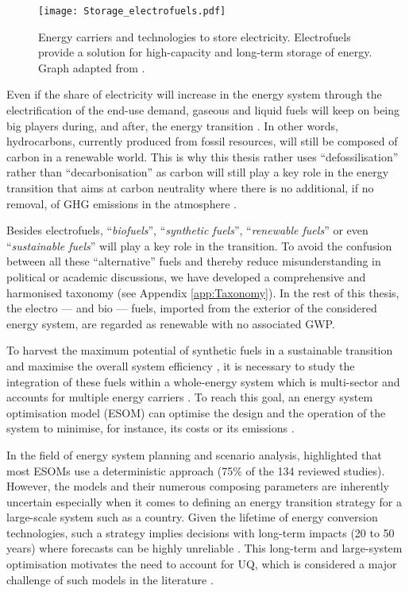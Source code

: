 \begin{figure}[htbp!]
\centering
\texttt{[image: Storage\_electrofuels.pdf]}
\caption{Energy carriers and technologies to store electricity. Electrofuels provide a solution for high-capacity and long-term storage of energy. Graph adapted from \cite{ISPT2017}.}
\label{fig:intro:Storage_electrofuels}
\end{figure}

\newpage
Even if the share of electricity will increase in the energy system through the electrification of the end-use demand, gaseous and liquid fuels will keep on being big players during, and after, the energy transition \cite{Ahlgren2012}. In other words, hydrocarbons, currently produced from fossil resources, will still be composed of carbon in a renewable world. This is why this thesis rather uses ``defossilisation'' rather than ``decarbonisation'' as carbon will still play a key role in the energy transition that aims at carbon neutrality where there is no additional, if no removal, of \gls{GHG} emissions in the atmosphere \cite{mertens2020carbon}. 

Besides electrofuels, ``\emph{biofuels}'', ``\emph{synthetic fuels}'', ``\emph{renewable fuels}'' or even ``\emph{sustainable fuels}'' will play a key role in the transition. To avoid the confusion between all these ``alternative'' fuels and thereby reduce misunderstanding in political or academic discussions, we have developed a comprehensive and harmonised taxonomy (see Appendix \ref{app:Taxonomy}).  In the rest of this thesis, the electro --- and bio --- fuels, imported from the exterior of the considered energy system, are regarded as renewable with no associated \gls{GWP}. 

To harvest the maximum potential of synthetic fuels in a sustainable transition and maximise the overall system efficiency \cite{mathiesen2015}, it is necessary to study the integration of these fuels within a whole-energy system which is multi-sector and accounts for multiple energy carriers \cite{contino2020whole}. To reach this goal, an energy system optimisation model (ESOM) can optimise the design and the operation of the system to minimise, for instance, its costs or its emissions \cite{zeng2011review}. 

In the field of energy system planning and scenario analysis, \citet{yue2018review} highlighted that most ESOMs use a deterministic approach (75\% of the 134 reviewed studies). However, the models and their numerous composing parameters are inherently uncertain especially when it comes to defining an energy transition strategy for a large-scale system such as a country. Given the lifetime of energy conversion technologies, such a strategy implies decisions with long-term impacts (20 to 50 years) where forecasts can be highly unreliable \cite{Moret2017}. This long-term and large-system optimisation motivates the need to account for \gls{UQ}, which is considered a major challenge of such models in the literature \cite{pfenninger2014energy}. %


